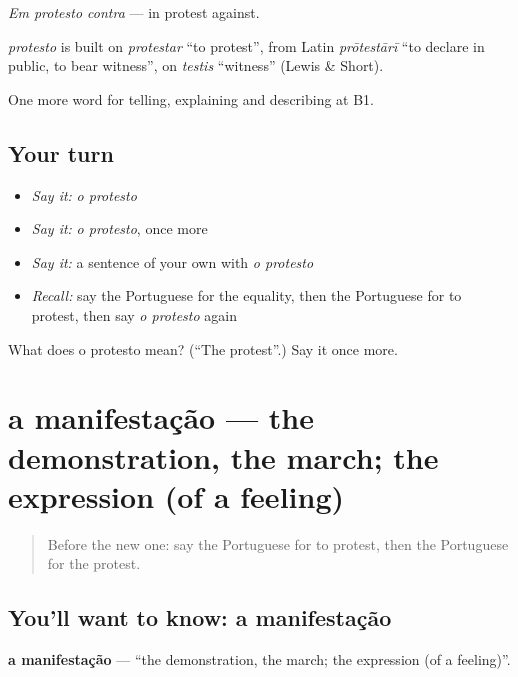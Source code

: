 \emph{Em protesto contra} — in protest against.

\begin{cousinweb}
\emph{protesto} is built on \emph{protestar} \textquotedblleft{}to protest\textquotedblright{}, from Latin \emph{prōtestārī} \textquotedblleft{}to declare in public, to bear witness\textquotedblright{}, on \emph{testis} \textquotedblleft{}witness\textquotedblright{} (Lewis \& Short).
\end{cousinweb}

\begin{grammarlens}[title={What you've built}]
One more word for telling, explaining and describing at B1.
\end{grammarlens}

\subsection*{Your turn}
\begin{itemize}
\raggedright
  \item \emph{Say it:} \emph{o protesto}
  \item \emph{Say it:} \emph{o protesto}, once more
  \item \emph{Say it:} a sentence of your own with \emph{o protesto}
  \item \emph{Recall:} say the Portuguese for the equality, then the Portuguese for to protest, then say \emph{o protesto} again
\end{itemize}

\begin{tcolorbox}[breakable,colback=teal!4,colframe=teal!35!black,title={Before you move on}]
What does o protesto mean? (\textquotedblleft{}The protest\textquotedblright{}.) Say it once more.
\end{tcolorbox}
\section[a manifestação]{a manifestação — the demonstration, the march; the expression (of a feeling)}

\label{lesson:PT-C364-manifestacao}



\begin{quote}
Before the new one: say the Portuguese for to protest, then the Portuguese for the protest.
\end{quote}

\subsection*{You'll want to know: a manifestação}
\textbf{a manifestação} — \textquotedblleft{}the demonstration, the march; the expression (of a feeling)\textquotedblright{}.

